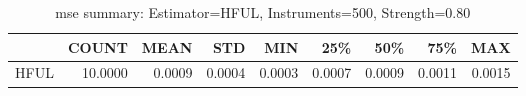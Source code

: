 \begin{table}[ht]
\centering
\caption{mse summary: Estimator=HFUL, Instruments=500, Strength=0.80}
\begin{tabular}{lrrrrrrrr}
\toprule
 & COUNT & MEAN & STD & MIN & 25\% & 50\% & 75\% & MAX \\
\midrule
HFUL & 10.0000 & 0.0009 & 0.0004 & 0.0003 & 0.0007 & 0.0009 & 0.0011 & 0.0015 \\
\bottomrule
\end{tabular}
\end{table}
